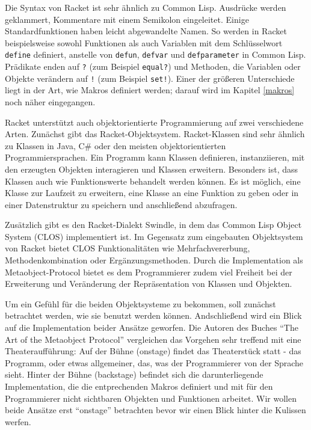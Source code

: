 Die Syntax von Racket ist sehr ähnlich zu Common Lisp. Ausdrücke werden geklammert, Kommentare mit einem Semikolon eingeleitet. Einige Standardfunktionen haben leicht abgewandelte Namen. So werden in Racket beispielsweise sowohl Funktionen als auch Variablen mit dem Schlüsselwort \texttt{define} definiert, anstelle von \texttt{defun}, \texttt{defvar} und \texttt{defparameter} in Common Lisp. Prädikate enden auf \texttt{?} (zum Beispiel \texttt{equal?}) und Methoden, die Variablen oder Objekte verändern auf \texttt{!} (zum Beispiel \texttt{set!}). Einer der größeren Unterschiede liegt in der Art, wie Makros definiert werden; darauf wird im Kapitel \ref{makros} noch näher eingegangen.

Racket unterstützt auch objektorientierte Programmierung auf zwei verschiedene Arten. Zunächst gibt das Racket-Objektsystem. Racket-Klassen sind sehr ähnlich zu Klassen in Java, C\# oder den meisten objektorientierten Programmiersprachen\cite{neu-edu2}. Ein Programm kann Klassen definieren, instanziieren, mit den erzeugten Objekten interagieren und Klassen erweitern. Besonders ist, dass Klassen auch wie Funktionswerte behandelt werden können. Es ist möglich, eine Klasse zur Laufzeit zu erweitern, eine Klasse an eine Funktion zu geben oder in einer Datenstruktur zu speichern und anschließend abzufragen\cite{neu-edu}. 

Zusätzlich gibt es den Racket-Dialekt Swindle, in dem das Common Lisp Object System (CLOS) implementiert ist. Im Gegensatz zum eingebauten Objektsystem von Racket bietet CLOS Funktionalitäten wie Mehrfachvererbung, Methodenkombination oder Ergänzungsmethoden. Durch die Implementation als Metaobject-Protocol bietet es dem Programmierer zudem viel Freiheit bei der Erweiterung und Veränderung der Repräsentation von Klassen und Objekten.

Um ein Gefühl für die beiden Objektsysteme zu bekommen, soll zunächst betrachtet werden, wie sie benutzt werden können. Andschließend wird ein Blick auf die Implementation beider Ansätze geworfen. Die Autoren des Buches ``The Art of the Metaobject Protocol''\cite{amop} vergleichen das Vorgehen sehr treffend mit eine Theateraufführung: Auf der Bühne (onstage) findet das Theaterstück statt - das Programm, oder etwas allgemeiner, das, was der Programmierer von der Sprache sieht. Hinter der Bühne (backstage) befindet sich die darunterliegende Implementation, die die entprechenden Makros definiert und mit für den Programmierer nicht sichtbaren Objekten und Funktionen arbeitet. Wir wollen beide Ansätze erst ``onstage'' betrachten bevor wir einen Blick hinter die Kulissen werfen.

